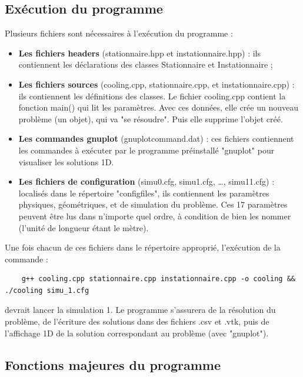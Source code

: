 \documentclass[11pt]{article} %
\begin{document}
	\subsection{Exécution du programme}
Plusieurs fichiers sont nécessaires à l’exécution du programme :
\begin{itemize}
	\item \textbf{Les fichiers headers} (stationnaire.hpp et instationnaire.hpp) : ils contiennent les déclarations des classes Stationnaire et Instationnaire ;
	\item \textbf{Les fichiers sources} (cooling.cpp, stationnaire.cpp, et instationnaire.cpp) : ils contiennent les définitions des classes. Le fichier cooling.cpp contient la fonction main() qui lit les paramètres. Avec ces données, elle crée un nouveau problème (un objet), qui va "se résoudre". Puis elle supprime l’objet créé.
	\item \textbf{Les commandes gnuplot} (gnuplot\textunderscore command\textunderscore *.dat) : ces fichiers contiennent les commandes à exécuter par le programme préinstallé "gnuplot" pour visualiser les solutions 1D.
	\item \textbf{Les fichiers de configuration} (simu\textunderscore 0.cfg, simu\textunderscore 1.cfg, …, simu\textunderscore 11.cfg) : localisés dans le répertoire "config\textunderscore files", ils contiennent les paramètres physiques, géométriques, et de simulation du problème. Ces 17 paramètres peuvent être lus dans n’importe quel ordre, à condition de bien les nommer (l’unité de longueur étant le mètre).
\end{itemize}
\par Une fois chacun de ces fichiers dans le répertoire approprié, l’exécution de la commande :
{
\color{blue}
\begin{verbatim}
	g++ cooling.cpp stationnaire.cpp instationnaire.cpp -o cooling && ./cooling simu_1.cfg
\end{verbatim}
}
\noindent devrait lancer la simulation 1. Le programme s’assurera de la résolution du problème, de l’écriture des solutions dans des fichiers .csv et .vtk, puis de l’affichage 1D de la solution correspondant au problème (avec "gnuplot").
	
	\subsection{Fonctions majeures du programme}
	
\end{document}
